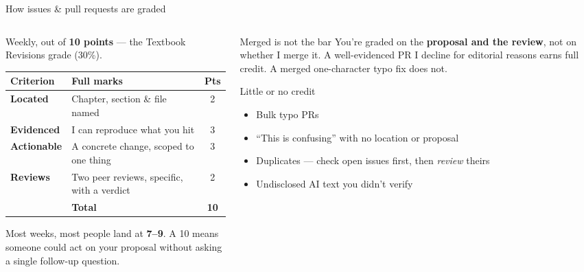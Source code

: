 \documentclass[9pt,aspectratio=169]{beamer}
\begin{document}
\begin{frame}{How issues \& pull requests are graded}
    \begin{columns}[T]
        \begin{column}{0.56\textwidth}
            Weekly, out of \textbf{10 points} --- the Textbook Revisions grade (30\%).
            \vspace{0.4em}
            \begin{table}
            \centering
            \footnotesize
            \begin{tabular}{llc}
                \toprule
                \textbf{Criterion} & \textbf{Full marks} & \textbf{Pts} \\ \midrule
                \textbf{Located} & Chapter, section \& file named & 2 \\
                \textbf{Evidenced} & I can reproduce what you hit & 3 \\
                \textbf{Actionable} & A concrete change, scoped to one thing & 3 \\
                \textbf{Reviews} & Two peer reviews, specific, with a verdict & 2 \\ \midrule
                & \textbf{Total} & \textbf{10} \\
                \bottomrule
            \end{tabular}
            \end{table}
            \vspace{0.4em}
            {\footnotesize Most weeks, most people land at \textbf{7--9}. A 10 means someone could act on your proposal without asking a single follow-up question.}
        \end{column}
        \begin{column}{0.4\textwidth}
            \begin{alertblock}{Merged is not the bar}
                \footnotesize You're graded on the \textbf{proposal and the review}, not on whether I merge it. A well-evidenced PR I decline for editorial reasons earns full credit. A merged one-character typo fix does not.
            \end{alertblock}
            \begin{block}{Little or no credit}
                \footnotesize
                \begin{itemize}\footnotesize
                    \item Bulk typo PRs
                    \item ``This is confusing'' with no location or proposal
                    \item Duplicates --- check open issues first, then \textit{review} theirs
                    \item Undisclosed AI text you didn't verify
                \end{itemize}
            \end{block}
        \end{column}
    \end{columns}
\end{frame}
\end{document}
